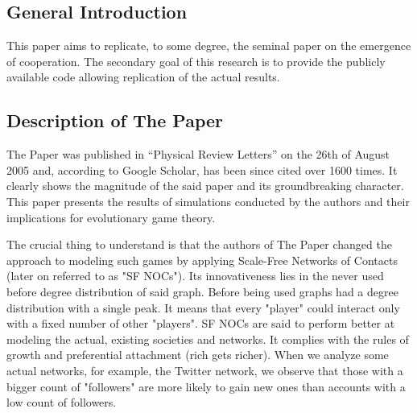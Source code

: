 \documentclass[english, twoside, 12pt, a4paper]{article}
\theoremstyle{definition}
\theoremstyle{plain}
\theoremstyle{remark}
\begin{document}
\subsection{General Introduction}

This paper aims to replicate, to some degree, the seminal paper \cite{santos2005scale} on the emergence of cooperation. The secondary goal of this research is to provide the publicly available code allowing replication of the actual results.

 
 \subsection{Description of The Paper}

The Paper was published in \enquote{Physical Review Letters} on the 26th of August 2005 and, according to Google Scholar, has been since cited over 1600 times. It clearly shows the magnitude of the said paper and its groundbreaking character. This paper presents the results of simulations conducted by the authors and their implications for evolutionary game theory.
 
 The crucial thing to understand is that the authors of The Paper changed the approach to modeling such games by applying Scale-Free Networks of Contacts (later on referred to as "SF NOCs"). Its innovativeness lies in the never used before degree distribution of said graph. Before being used graphs had a degree distribution with a single peak. It means that every "player" could interact only with a fixed number of other "players". SF NOCs are said to 
 perform better at modeling the actual, existing societies and networks. It complies with the rules of growth and preferential attachment (rich gets richer). When we analyze some actual networks, for example, the Twitter network, we observe that those with a bigger count of "followers" are more likely to gain new ones than accounts 
 with a low count of followers. 
 
\end{document}
